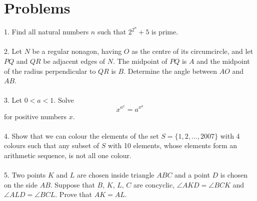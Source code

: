 \documentclass{article}
\begin{document}
\section*{Problems}
1. Find all natural numbers $n$ such that $2^{2^n}+5$ is prime. \\\\
2. Let $N$ be a regular nonagon, having $O$ as the centre of its circumcircle, and let $PQ$ and $QR$ be adjacent edges of $N$. The midpoint of $PQ$ is $A$ and the midpoint of the radius perpendicular to $QR$ is $B$. Determine the angle between $AO$ and $AB$.\\\\
3. Let $0<a<1$. Solve $$x^{a^x}=a^{x^a}$$ for positive numbers $x$. \\\\
4. Show that we can colour the elements of the set $S=\{1,2,\ldots, 2007\}$ with 4 colours such that any subset of $S$ with 10 elements, whose elements form an arithmetic sequence, is not all one colour. \\\\
5. Two points $K$ and $L$ are chosen inside triangle $ABC$ and a point $D$ is chosen on the side $AB$. Suppose that $B$, $K$, $L$, $C$ are concyclic, $\angle AKD = \angle BCK$ and $\angle ALD = \angle BCL$. Prove that $AK = AL$.
\end{document}
